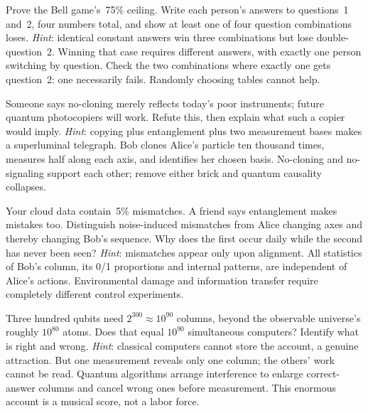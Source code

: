 \begin{puzzles}
\item Prove the Bell game's~75\% ceiling. Write each person's answers to questions~1 and~2, four numbers total, and show at least one of four question combinations loses. \emph{Hint}: identical constant answers win three combinations but lose double-question~2. Winning that case requires different answers, with exactly one person switching by question. Check the two combinations where exactly one gets question~2: one necessarily fails. Randomly choosing tables cannot help.
\item Someone says no-cloning merely reflects today's poor instruments; future quantum photocopiers will work. Refute this, then explain what such a copier would imply. \emph{Hint}: copying plus entanglement plus two measurement bases makes a superluminal telegraph. Bob clones Alice's particle ten thousand times, measures half along each axis, and identifies her chosen basis. No-cloning and no-signaling support each other; remove either brick and quantum causality collapses.
\item Your cloud data contain~5\% mismatches. A friend says entanglement makes mistakes too. Distinguish noise-induced mismatches from Alice changing axes and thereby changing Bob's sequence. Why does the first occur daily while the second has never been seen? \emph{Hint}: mismatches appear only upon alignment. All statistics of Bob's column, its 0/1 proportions and internal patterns, are independent of Alice's actions. Environmental damage and information transfer require completely different control experiments.
\item Three hundred qubits need \(2^{300}\approx10^{90}\) columns, beyond the observable universe's roughly \(10^{80}\) atoms. Does that equal \(10^{90}\) simultaneous computers? Identify what is right and wrong. \emph{Hint}: classical computers cannot store the account, a genuine attraction. But one measurement reveals only one column; the others' work cannot be read. Quantum algorithms arrange interference to enlarge correct-answer columns and cancel wrong ones before measurement. This enormous account is a musical score, not a labor force.
\end{puzzles}
